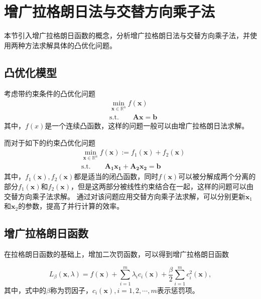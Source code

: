 \section{增广拉格朗日法与交替方向乘子法}

本节引入增广拉格朗日函数的概念，分析增广拉格朗日法\cite{1976AugLagrange}与交替方向乘子法\cite{1975ADMMBook}，并使用两种方法求解具体的凸优化问题。

\subsection{凸优化模型}

考虑带约束条件的凸优化问题
\begin{equation}
    \begin{split}
        &\min\limits_{\bm{x}\in \mathbb{R}^{n}} f(\bm{x}) \\
        &\mathrm{s. t.} \quad\quad \bm{Ax} = \bm{b}
    \end{split}
    \label{eq_admm_1}
\end{equation}
其中，$f(x)$是一个连续凸函数，这样的问题一般可以由增广拉格朗日法求解。

而对于如下的约束凸优化问题
\begin{equation}
    \begin{split}
        &\min\limits_{\bm{x}\in \mathbb{R}^{n}} f(\bm{x}) := f_{1}(\bm{x}) + f_{2}(\bm{x}) \\
        &\mathrm{s. t.} \quad\quad \bm{A_{1}x_{1}} + \bm{A_{2}x_{2}} = \bm{b} 
    \end{split}
    \label{eq_admm_2}
\end{equation}
其中，$f_{1}(\bm{x}), f_{2}(\bm{x})$都是适当的闭凸函数，同时$f(\bm{x})$可以被分解成两个分离的部分$f_{1}(\bm{x})$和$f_{2}(\bm{x})$，但是这两部分被线性约束结合在一起，这样的问题可以由交替方向乘子法求解。
通过对该问题应用交替方向乘子法求解，可以分别更新$\bm{x}_{1}$和$\bm{x}_{2}$的参数，提高了并行计算的效率。

\subsection{增广拉格朗日函数}

在拉格朗日函数的基础上，增加二次罚函数，可以得到增广拉格朗日函数

\begin{equation}
    L_{\beta}(\bm{x}, \lambda) = f(\bm{x}) + \sum_{i=1}^{m}\lambda_{i} c_{i}(\bm{x}) + \frac{\beta}{2}\sum_{i=1}^{m}c_{i}^{2}(\bm{x}),
    \label{eq_admm_3}
\end{equation}
其中，式中的$\beta$称为罚因子，$c_{i}(\bm{x}), i=1, 2, \cdots, m$表示惩罚项。

